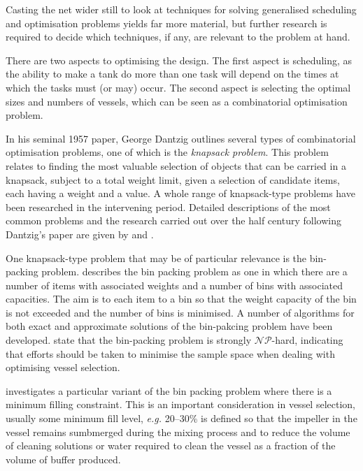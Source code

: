 Casting the net wider still to look at techniques for solving generalised
scheduling and optimisation problems yields far more material, but further 
research is required to decide which techniques, if any, are relevant to the 
problem at hand.

There are two aspects to optimising the design.  The first aspect is scheduling,
as the ability to make a tank do more than one task will depend on the times
at which the tasks must (or may) occur.  The second aspect is selecting the
optimal sizes and numbers of vessels, which can be seen as a combinatorial
optimisation problem.

In his seminal 1957 paper, George Dantzig \nocite{Dantzig:1957} outlines several
types of combinatorial optimisation problems, one of which is the
\emph{knapsack problem}.  This problem relates to finding the most valuable
selection of objects that can be carried in a knapsack, subject to a total
weight limit, given a selection of candidate items, each having a weight and a 
value.
A whole range of knapsack-type problems have been researched in the intervening
period.  Detailed descriptions of the most common problems and the research 
carried out over the half century following Dantzig's paper are given by 
\citet{Korte:2012} and \citet{Martello:1990}.

One knapsack-type problem that may be of particular relevance is the bin-packing
problem.  \citet{Martello:1990} describes the bin packing problem as one in
which there are a number of items with associated weights and a number of bins
with associated capacities.  The aim is to each item to a bin so that the weight
capacity of the bin is not exceeded and the number of bins is minimised.
A number of algorithms for both exact and approximate solutions of the
bin-pakcing problem have been developed. \citet{Korte:2012} state that the
bin-packing problem is strongly $\mathcal{NP}$-hard, indicating that efforts
should be taken to minimise the sample space when dealing with optimising vessel
selection.

\citet{Bettinelli:2010} investigates a particular variant of the bin packing
problem where there is a minimum filling constraint.  This is an important
consideration in vessel selection, usually some minimum fill level,
\textit{e.g.} 20--30\% is defined so that the impeller in the vessel remains
sumbmerged during the mixing process and to reduce the volume of cleaning
solutions or water required to clean the vessel as a fraction of the volume of 
buffer produced.

